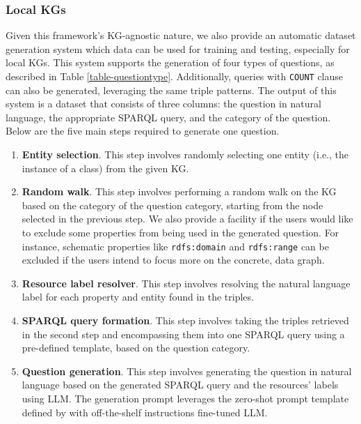 \subsubsection{Local KGs} \label{dataset-generator}
Given this framework's KG-agnostic nature, we also provide an automatic dataset generation system which data can be used for training and testing, especially for local KGs. This system supports the generation of four types of questions, as described in Table \ref{table-questiontype}. Additionally, queries with \texttt{COUNT} clause can also be generated, leveraging the same triple patterns. The output of this system is a dataset that consists of three columns: the question in natural language, the appropriate SPARQL query, and the category of the question. Below are the five main steps required to generate one question.

\begin{enumerate}
    \item \textbf{Entity selection}. This step involves randomly selecting one entity (i.e., the instance of a class) from the given KG. 
    \item \textbf{Random walk}. This step involves performing a random walk on the KG based on the category of the question category, starting from the node selected in the previous step. We also provide a facility if the users would like to exclude some properties from being used in the generated question. For instance, schematic properties like \texttt{rdfs:domain} and \texttt{rdfs:range} can be excluded if the users intend to focus more on the concrete, data graph.
    \item \textbf{Resource label resolver}. This step involves resolving the natural language label for each property and entity found in the triples. 
    \item \textbf{SPARQL query formation}. This step involves taking the triples retrieved in the second step and encompassing them into one SPARQL query using a pre-defined template, based on the question category.
    \item \textbf{Question generation}. This step involves generating the question in natural language based on the generated SPARQL query and the resources' labels using LLM. The generation prompt leverages the zero-shot prompt template defined by \cite{Both2024TowardsLN} with off-the-shelf instructions fine-tuned LLM.
\end{enumerate}

